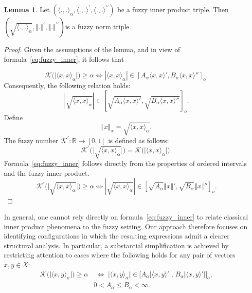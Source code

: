 \documentclass[preprint,12pt]{elsarticle}
\newcommand{\norm}[1]{\left\Vert#1\right\Vert}
\theoremstyle{definition}
\newtheorem{lemma}{Lemma}[section]
\begin{document}
\begin{lemma}
	Let  $(\langle  ., . \rangle_\alpha,\langle .,.\rangle^\prime,\langle .,.\rangle^{\prime\prime})$ be a fuzzy inner product triple.  Then $(\sqrt{\langle  ., . \rangle_\alpha},\norm{.}^\prime,\norm{.}^{\prime\prime})$is  a fuzzy norm triple.
\end{lemma} 
\begin{proof}
	Given the assumptions of the lemma, and in view of formula~\eqref{eq:fuzzy_inner}, it follows that
	
	\[
	\mathcal{K}\big(\big|\langle  x, x \rangle_\alpha\big|\big) \geq \alpha \Longleftrightarrow |\langle  x, x \rangle_\alpha| \in [ A_\alpha\langle x, x \rangle', B_\alpha\langle x, x \rangle'']_o.
	\]
Consequently, the following relation holds:
	\[
 |\sqrt{\langle  x, x \rangle_\alpha}| \in [ \sqrt{A_\alpha\langle x, x \rangle'}, \sqrt{B_\alpha\langle x, x \rangle''}]_o.
\]
	Define 
\begin{equation}\label{eq:norm_alpha,inner product_alpha}
	\norm{x}_\alpha = \sqrt{\langle  x, x \rangle_\alpha}.
\end{equation}
The fuzzy number $\mathcal{K}^\prime:\mathbb{R}\to [0,1]$ is defined as follows:
\[\mathcal{K^\prime}\big(\big|\sqrt{\langle  x, x \rangle_\alpha}\big|\big) =\mathcal{K}\big(\big|\langle  x, x \rangle_\alpha\big|\big). \]
	Formula~\eqref{eq:fuzzy_inner} follows directly from the properties of ordered intervals and the fuzzy inner product.
		\[
	\mathcal{K^\prime}\big(\big|\sqrt{\langle  x, x \rangle_\alpha}\big|\big) \geq \alpha \Longleftrightarrow |\sqrt{\langle  x, x \rangle_\alpha}| \in [ \sqrt{A_\alpha}\norm{x}', \sqrt{B_\alpha}\norm{x}'']_o.
	\]
\end{proof}
In general, one cannot rely directly on formula~\eqref{eq:fuzzy_inner} to relate classical inner product phenomena to the fuzzy setting. Our approach therefore focuses on identifying configurations in which the resulting expressions admit a clearer structural analysis. In particular, a substantial simplification is achieved by restricting attention to cases where the following holds for any pair of vectors $x, y \in X$:
\begin{equation}\label{eq:fuzzyinerproduct-simple1}
	\begin{split}
		\mathcal{K}\big(	\big|\langle  x, y \rangle_\alpha \big|\big) \geq \alpha 
		&\;\Longleftrightarrow\;
			\big|\langle  x, y \rangle_\alpha \big| \in 
		\bigl[A_{\alpha} |\langle x,y\rangle'|,\, B_{\alpha} |\langle x,y\rangle'|\bigr]_o,\\
		& 0 < A_{\alpha} \leq B_{\alpha} <\infty.
	\end{split}
\end{equation}
\end{document}
